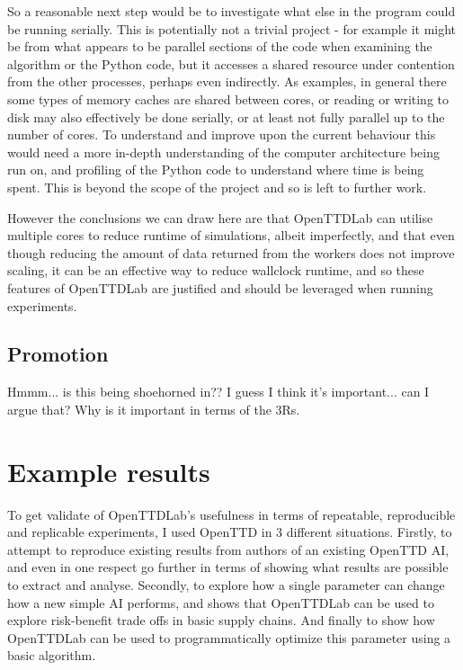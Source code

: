 \documentclass[logo,msc,dsti]{infthesis}    %
\begin{document}
So a reasonable next step would be to investigate what else in the program could be running serially. This is potentially not a trivial project - for example it might be from what appears to be parallel sections of the code when examining the algorithm or the Python code, but it accesses a shared resource under contention from the other processes, perhaps even indirectly. As examples, in general there some types of memory caches are shared between cores, or reading or writing to disk  may also effectively be done serially, or at least not fully parallel up to the number of cores. To understand and improve upon the current behaviour this would need a more in-depth understanding of the computer architecture being run on, and profiling of the Python code to understand where time is being spent. This is beyond the scope of the project and so is left to further work.

However the conclusions we can draw here are that OpenTTDLab can utilise multiple cores to reduce runtime of simulations, albeit imperfectly, and that even though reducing the amount of data returned from the workers does not improve scaling, it can be an effective way to reduce wallclock runtime, and so these features of OpenTTDLab are justified and should be leveraged when running experiments.

\section{Promotion}

Hmmm... is this being shoehorned in?? I guess I think it's important... can I argue that? Why is it important in terms of the 3Rs.


\chapter{Example results}

To get validate of OpenTTDLab's usefulness in terms of repeatable, reproducible and replicable experiments, I used OpenTTD in 3 different situations. Firstly, to attempt to reproduce existing results from authors of an existing OpenTTD AI, and even in one respect go further in terms of showing what results are possible to extract and analyse. Secondly, to explore how a single parameter can change how a new simple AI performs, and shows that OpenTTDLab can be used to explore risk-benefit trade offs in basic supply chains. And finally to show how OpenTTDLab can be used to programmatically optimize this parameter using a basic algorithm.
\end{document}
